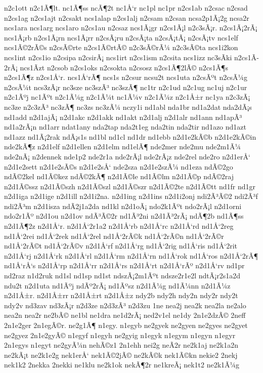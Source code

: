 {n2c1ott
n2c1Ã¶lt.
nc1Ã¶ss
ncÃ¶2t
nc1Å‘r
nc1pl
nc1pr
n2cs1ab
n2csac
n2csad
n2cs1ag
n2cs1ajt
n2csakt
ncs1alap
n2cs1alj
n2csam
n2csan
ncsa2p1Ã¡2g
ncsa2r
ncs1ara
ncs1arg
ncs1aro
n2cs1au
n2csaz
ncs1Ã¡gr
n2cs1Ã¡l
n2c3sÃ¡r.
n2cs1Ã¡2rÃ¡
ncs1Ã¡rb
n2cs1Ã¡rn
ncs1Ã¡rr
n2csÃ¡ru
n2csÃ¡ta
n2csÃ¡tÃ¡
n2csÃ¡tv
ncs1elf
ncs1Ã©2rÃ©s
n2csÃ©rte
n2cs1Ã©rtÃ©
n2c3sÃ©rÃ¼
n2c3sÃ©ta
ncs1i2kon
ncs1int
n2cs1io
n2csipa
n2csirÃ¡
ncs1irt
n2cs1ism
n2csita
ncs1izz
nc3sÃ­ki
n2cs1Ã­2rÃ¡
ncs1Ã­zt
n2csob
n2cs1oks
n2csokta
n2csosz
n2cs1Ã¶2lÃ©
n2cs1Ã¶s
n2cs1Ã¶z
n2cs1Å‘r.
ncs1Å‘rÃ¶
ncs1s
n2csur
ncsu2t
ncs1uta
n2csÃºt
n2csÃ¼g
n2csÃ¼t
ncs3zÃ¡r
nc3sze
nc3szÃ³
nc3szÃ¶
nc1tr
n2c1ud
n2c1ug
nc1uj
n2c1ur
n2c1Ãºj
nc1Ãºt
n2c1Ã¼g
n2c1Ã¼t
nc1Ã¼v
n2c1Ã¼z
n2c1Å±r
nc1ya
n2c3zÃ¡
nc3ze
n2c3zÃ³
nc3zÃ¶
nc3zs
nc3zÃ¼
nczy1i
nd1abl
nda1br
nd1a2dat
nda2dÃ¡s
nd1add
n2d1ajÃ¡
n2d1akc
n2d1akk
nd1akt
n2d1alj
n2d1alr
nd1ann
nd1apÃ³
nd1a2rÃ¡n
nd1arr
ndat1any
nda2tap
nda2t1eg
nda2tin
nda2tir
nd1azo
nd1azt
nd1azz
nd1Ã¡2rak
ndÃ¡s1s
nd1bl
nd1cl
nd1dr
nd1ebb
n2d1e2kÃ©b
n2d1e2kÃ©in
nde2kÃ¶z
n2d1elf
n2d1ellen
n2d1elm
nd1elÃ¶
nde2mer
nde2mu
nde2m1Ã¼
nde2nÃ¡
n2dennek
nde1p2
nde2r1a
nde2rÃ¡l
nde2rÃ¡z
nde2rel
nde2ro
n2d1erÅ‘
n2d1e2sett
n2d1e2sÃ©s
n2d1e2sÅ‘
nde2sza
n2d1e2szÃ¼
nd1eza
ndÃ©2go
ndÃ©2kel
nd1Ã©kez
ndÃ©2kÃ¶
n2d1Ã©le
nd1Ã©lm
n2d1Ã©p
ndÃ©2raj
n2d1Ã©ssz
n2d1Ã©szh
n2d1Ã©szl
n2d1Ã©szr
n2d1Ã©2te
n2d1Ã©tt
nd1fr
nd1gr
n2d1iga
n2d1ige
n2d1ill
n2d1i2na.
n2d1ing
n2d1ins
n2d1i2onj
ndi2Ã³Ã©2
ndi2Ã³f
ndi2Ã³m
n2d1isza
ndÃ­2j1a2da
nd1kl
n2d1oÃ¡
ndo2k1Ãºt
ndo2rÃ¡l
n2d1orni
ndo2r1Ãº
n2d1ou
n2d1ov
ndÃ³Ã©2r
nd1Ã³2ni
n2d1Ã³2rÃ¡
ndÃ¶2b
nd1Ã¶ss
n2d1Ã¶2z
n2d1Å‘r.
n2d1Å‘2r1a2
n2d1Å‘rb
n2d1Å‘rc
n2d1Å‘rd
nd1Å‘2reg
nd1Å‘2rei
nd1Å‘2rek
nd1Å‘2rel
nd1Å‘2rÃ©k
nd1Å‘2rÃ©n
nd1Å‘2rÃ©r
nd1Å‘2rÃ©t
nd1Å‘2rÃ©v
n2d1Å‘rf
n2d1Å‘rg
nd1Å‘2rig
nd1Å‘ris
nd1Å‘2rit
n2d1Å‘rj
n2d1Å‘rk
n2d1Å‘rl
n2d1Å‘rm
n2d1Å‘rn
nd1Å‘rok
nd1Å‘ros
n2d1Å‘2rÃ¶
nd1Å‘rÅ‘s
n2d1Å‘rp
n2d1Å‘rr
n2d1Å‘rs
n2d1Å‘rt
n2d1Å‘rÃº
n2d1Å‘rv
nd1pr
nd2raz
n1d2ruk
nd1sl
nd1sp
nd1st
ndszÃ¡2m1Ãºt
ndsze2r1e2l
ndtÃ¡r2s1a2d
ndu2t
n2d1uta
nd1Ãºj
ndÃº2rÃ¡
nd1Ãºsz
n2d1Ã¼g
nd1Ã¼nn
n2d1Ã¼z
n2d1Å±r.
n2d1Å±rr
n2d1Å±rt
n2d1Å±z
ndy2b
ndy2h
ndy2n
ndy2r
ndy2t
ndy2v
nd3zav
nd3zÃ¡r
n2d3ze
n2d3zÃ³
n2d3zu
1ne
nea2j
nea2k
nea2la
ne2alo
nea2n
nea2r
ne2bÃ©
ne1bl
ne1dra
ne1d2rÃ¡
ned2v1el
ne1dy
2n1e2dzÃ©
2neff
2n1e2ger
2n1egÃ©r.
ne2g1Ã¶
n1egy.
n1egyb
ne2gyek
ne2gyen
ne2gyes
ne2gyet
ne2gyez
2n1e2gyÃ©
n1egyf
n1egyh
ne2gyig
n1egyk
n1egym
n1egyn
n1egyr
2n1egys
n1egyt
ne2gyÃ¼n
nehÃ©z1
2n1ehh
nei2g
neÃ­2r
ne2k1aj
ne2k1a2n
ne2kÃ¡t
ne2k1e2g
nek1erÅ‘
nek1Ã©2jÃ©
ne2kÃ©k
nek1Ã©kn
nekie2
2nekj
nek1k2
2nekka
2nekki
ne1klu
ne2k1ok
nekÃ¶2r
ne1kreÃ¡
nek1t2
ne2k1Ã¼g
}
